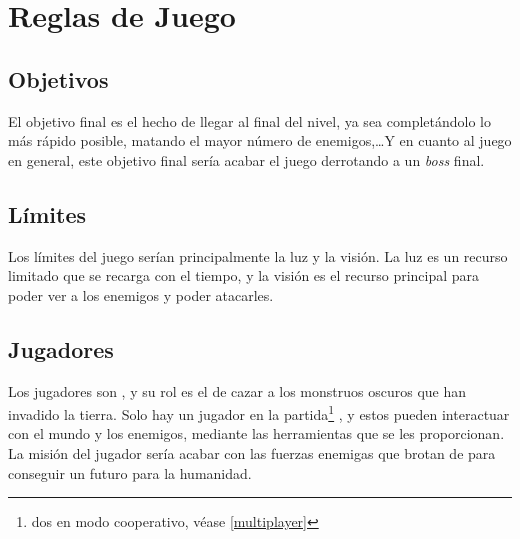 \section{Reglas de Juego}
    \begin{multicols}{2}

        \subsection{Objetivos}
        El objetivo final es el hecho de llegar al final del nivel, ya sea completándolo lo más rápido posible, matando el mayor número de enemigos,\dots\space Y en cuanto al juego en general, este objetivo final sería acabar el juego derrotando a un \textit{boss} final.
        \subsection{Límites}
        Los límites del juego serían principalmente la luz y la visión. La luz es un recurso limitado que se recarga con el tiempo, y la visión es el recurso principal para poder ver a los enemigos y poder atacarles.

        \subsection{Jugadores}
        Los jugadores son \hunters, y su rol es el de cazar a los monstruos oscuros que han invadido la tierra. Solo hay un jugador en la partida\footnote{dos en modo cooperativo, véase \ref{multiplayer}} , y estos pueden interactuar con el mundo y los enemigos, mediante las herramientas que se les proporcionan.
        La misión del jugador sería acabar con las fuerzas enemigas que brotan de \hole para conseguir un futuro para la humanidad.


\end{multicols}
